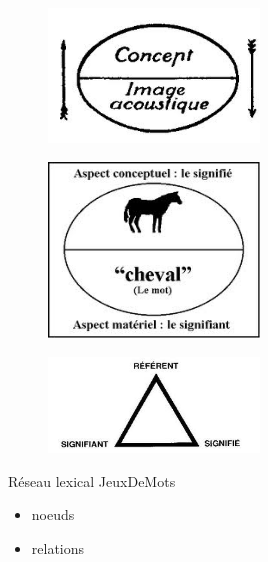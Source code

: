\documentclass{beamer}
\begin{document}
\begin{frame}  
\begin{figure}[h!]
  \centering
      \includegraphics[width=0.5\textwidth]{img/signe-conceptimageacoustique.jpeg}
\end{figure}
\end{frame}

\begin{frame}
\begin{figure}[h!]
  \centering
      \includegraphics[width=0.5\textwidth]{img/signe-cheval.jpeg}
\end{figure}
\end{frame}

\begin{frame}
\begin{figure}[h!]
  \centering
      \includegraphics[width=0.5\textwidth]{img/trianglesemiotique.jpeg}
\end{figure}
\end{frame}

\begin{frame}
  Réseau lexical JeuxDeMots
  \begin{itemize}
  \item noeuds
  \item relations
  \end{itemize}
\end{frame}
\end{document}
